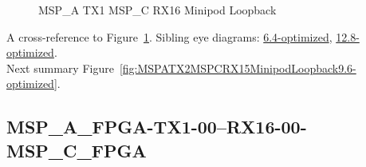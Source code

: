 \begin{figure}[h]
\begin{subfigure}{0.33\textwidth}
\hyperref[sec:MSPAFPGATX106RX1606MSPCFPGA9.6-optimized]{}
\end{subfigure}\hspace*{\fill}
\begin{subfigure}{0.33\textwidth}
\hyperref[sec:MSPAFPGATX107RX1607MSPCFPGA9.6-optimized]{}
\end{subfigure}\hspace*{\fill}
\begin{subfigure}{0.33\textwidth}
\hyperref[sec:MSPAFPGATX108RX1608MSPCFPGA9.6-optimized]{}
\end{subfigure}

\begin{subfigure}{0.33\textwidth}
\hyperref[sec:MSPAFPGATX109RX1609MSPCFPGA9.6-optimized]{}
\end{subfigure}\hspace*{\fill}
\begin{subfigure}{0.33\textwidth}
\hyperref[sec:MSPAFPGATX110RX1610MSPCFPGA9.6-optimized]{}
\end{subfigure}\hspace*{\fill}
\begin{subfigure}{0.33\textwidth}
\hyperref[sec:MSPAFPGATX111RX1611MSPCFPGA9.6-optimized]{}
\end{subfigure}

\caption{MSP\_A TX1 MSP\_C RX16 Minipod Loopback} \label{fig:MSPATX1MSPCRX16MinipodLoopback9.6-optimized}
\end{figure}

A cross-reference to Figure~\ref{fig:MSPATX1MSPCRX16MinipodLoopback9.6-optimized}.
Sibling eye diagrams: \hyperref[sec:MSPATX1MSPCRX16MinipodLoopback6.4-optimized]{6.4-optimized}, \hyperref[sec:MSPATX1MSPCRX16MinipodLoopback12.8-optimized]{12.8-optimized}. \\
Next summary Figure~\ref{fig:MSPATX2MSPCRX15MinipodLoopback9.6-optimized}.
\clearpage
% 
\subsection{MSP\_A\_FPGA-TX1-00--RX16-00-MSP\_C\_FPGA}\label{sec:MSPAFPGATX100RX1600MSPCFPGA9.6-optimized}

